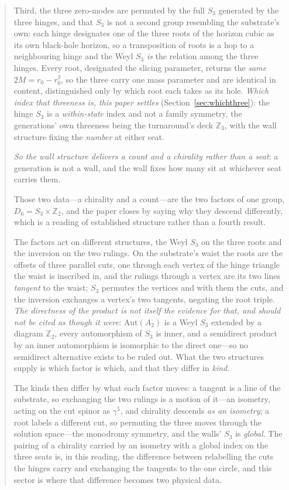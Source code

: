 \documentclass[11pt]{article}
\begin{document}
\begin{abstract}
Third, the three zero-modes are permuted by the full $S_3$ generated by the three hinges, and that $S_3$ is not a second group resembling the substrate's own: each hinge designates one of the three roots of the horizon cubic as its own black-hole horizon, so a transposition of roots is a hop to a neighbouring hinge and the Weyl $S_3$ \emph{is} the relation among the three hinges. Every root, designated the slicing parameter, returns the \emph{same} $2M=r_0-r_0^3$, so the three carry one mass parameter and are identical in content, distinguished only by which root each takes as its hole. \emph{Which index that threeness is, this paper settles} (Section~\ref{sec:whichthree}): the hinge $S_3$ is a \emph{within-state} index and not a family symmetry, the generations' own threeness being the turnaround's deck $\mathbb{Z}_3$, with the wall structure fixing the \emph{number} at either seat. 

\emph{So the wall structure delivers a count and a chirality rather than a seat}: a generation is not a wall, and the wall fixes how many sit at whichever seat carries them. 

Those two data---a chirality and a count---are the two factors of one group, $D_6=S_3\times\mathbb{Z}_2$, and the paper closes by saying why they descend differently, which is a reading of established structure rather than a fourth result. 

The factors act on different structures, the Weyl $S_3$ on the three roots and the inversion on the two rulings. On the substrate's waist the roots are the offsets of three parallel cuts, one through each vertex of the hinge triangle the waist is inscribed in, and the rulings through a vertex are its two lines \emph{tangent} to the waist; $S_3$ permutes the vertices and with them the cuts, and the inversion exchanges a vertex's two tangents, negating the root triple. \emph{The directness of the product is not itself the evidence for that, and should not be cited as though it were}: $\mathrm{Aut}(A_{2})$ is a Weyl $S_{3}$ extended by a diagram $\mathbb{Z}_{2}$, every automorphism of $S_{3}$ is inner, and a semidirect product by an inner automorphism is isomorphic to the direct one---so no semidirect alternative exists to be ruled out. What the two structures supply is which factor is which, and that they differ in \emph{kind}. 

The kinds then differ by what each factor moves: a tangent is a line of the substrate, so exchanging the two rulings is a motion of it---an isometry, acting on the cut spinor as $\gamma^5$, and chirality descends \emph{as an isometry}; a root labels a different cut, so permuting the three moves through the solution space---the
monodromy symmetry, and the walls' $S_3$ is \emph{global}. The pairing of a chirality carried by an isometry with a global index on the three seats is, in this reading, the difference between relabelling the cuts the hinges carry and exchanging the tangents to the one circle, and this sector is where that difference becomes two physical data. 


\end{abstract}
\end{document}

